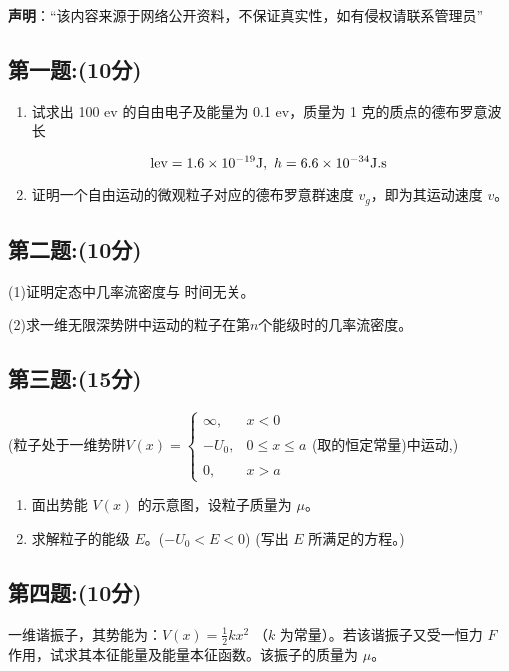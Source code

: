 
\textbf{声明}：“该内容来源于网络公开资料，不保证真实性，如有侵权请联系管理员”

\subsection{第一题:(10分)}
\begin{enumerate}
  \item 试求出 100 ev 的自由电子及能量为 0.1 ev，质量为 1 克的质点的德布罗意波长

  \[  \text{lev} = 1.6 \times 10^{-19} \\ \text{J}, \ h = 6.6 \times 10^{-34} \\ \text{J.s}~\]

  \item 证明一个自由运动的微观粒子对应的德布罗意群速度 $v_g$，即为其运动速度 $v$。
\end{enumerate}
\subsection{第二题:(10分)}
(1)证明定态中几率流密度与 时间无关。

(2)求一维无限深势阱中运动的粒子在第$n$个能级时的几率流密度。
\subsection{第三题:(15分)}
(粒子处于一维势阱$V(x) = \begin{cases}    \infty, & x < 0 \\\\    -U_0, & 0 \leq x \leq a \\\\    0, & x > a  \end{cases}$(取的恒定常量)中运动,)

\begin{enumerate}
  \item 面出势能 $V(x)$ 的示意图，设粒子质量为 $\mu$。
  \item 求解粒子的能级 $E$。($-U_0 < E < 0$) (写出 $E$ 所满足的方程。)
\end{enumerate}
\subsection{第四题:(10分)}
一维谐振子，其势能为：$V(x) = \frac{1}{2} k x^2$
（$k$ 为常量）。若该谐振子又受一恒力 $F$ 作用，试求其本征能量及能量本征函数。该振子的质量为 $\mu$。